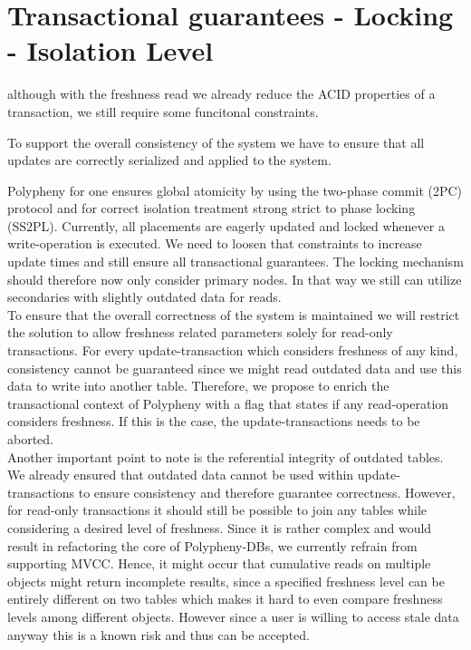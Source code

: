 

\section{Transactional guarantees - Locking - Isolation Level}
\label{consistency}

although with the freshness read we already reduce the ACID properties of a transaction, we still require some funcitonal constraints.



To support the overall consistency of the system we have to ensure that all updates are correctly serialized and applied to the system.

Polypheny for one ensures global atomicity by using the two-phase commit (2PC) protocol and for correct isolation treatment
strong strict to phase locking (SS2PL). Currently, all placements are eagerly updated and locked whenever a write-operation is executed.
We need to loosen that constraints to increase update times and still ensure all transactional guarantees. The locking mechanism should therefore 
now only consider primary nodes. In that way we still can utilize secondaries with slightly outdated data for reads.\\

To ensure that the overall correctness of the system is maintained we will restrict the solution to allow freshness related parameters solely
for read-only transactions. For every update-transaction which considers freshness of any kind, consistency cannot be guaranteed since we might read outdated data
and use this data to write into another table. Therefore, we propose to enrich  the transactional context of Polypheny with a flag that states if any read-operation 
considers freshness. If this is the case, the update-transactions needs to be aborted.\\


Another important point to note is the referential integrity of outdated tables. We already ensured that outdated data cannot be used within update-transactions to 
ensure consistency and therefore guarantee correctness. However, for read-only transactions it should still be possible to join any tables while considering 
a desired level of freshness. 
Since it is rather complex and would result in refactoring the core of Polypheny-DBs, we currently refrain from supporting MVCC.
Hence, it might occur that cumulative reads on multiple objects might return incomplete results, since a specified freshness
level can be entirely different on two tables which makes it hard to even compare freshness levels among different objects. However since a user is willing to access 
stale data anyway this is a known risk and thus can be accepted.\\

